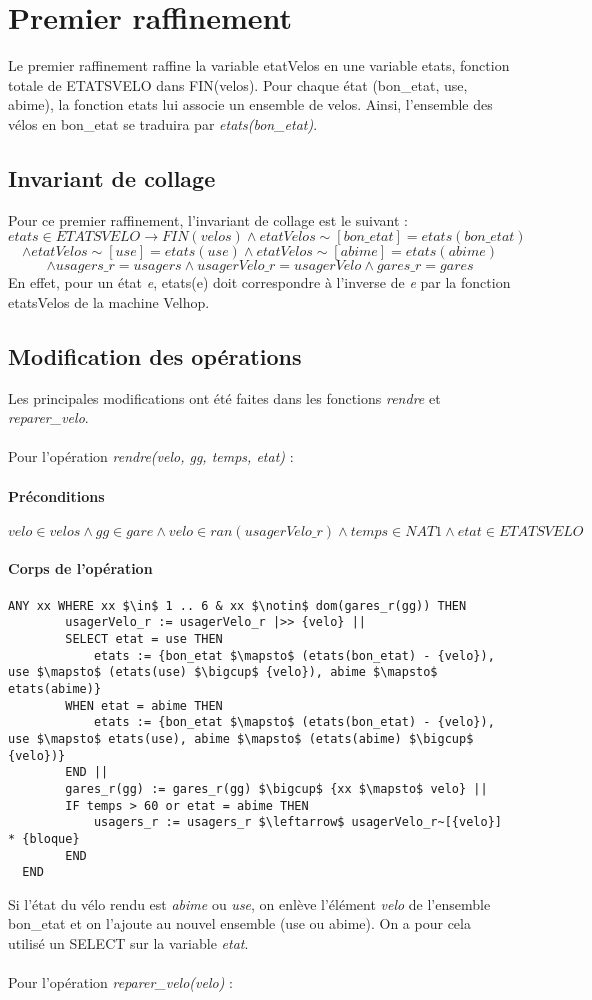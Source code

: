 \documentclass[12pt]{article}
\begin{document}
\section{Premier raffinement}
Le premier raffinement raffine la variable etatVelos en une variable etats, fonction totale de ETATSVELO dans FIN(velos). Pour chaque état (bon\_etat, use, abime), la fonction etats lui associe un ensemble de velos. Ainsi, l'ensemble des vélos en bon\_etat se traduira par \textit{etats(bon\_etat)}.
\subsection{Invariant de collage}
Pour ce premier raffinement, l'invariant de collage est le suivant : \\
\[ etats \in ETATSVELO \rightarrow FIN(velos) \land etatVelos\sim[{bon\_etat}] = etats(bon\_etat) \]
\[ \land etatVelos\sim[{use}] = etats(use) \land etatVelos\sim[{abime}] = etats(abime) \]
\[ \land usagers\_r = usagers \land usagerVelo\_r = usagerVelo \land gares\_r = gares \]
En effet, pour un état \textit{e}, etats(e) doit correspondre à l'inverse de \textit{e} par la fonction etatsVelos de la machine Velhop.
\subsection{Modification des opérations}
Les principales modifications ont été faites dans les fonctions \textit{rendre} et \textit{reparer\_velo}. \\ \\
Pour l'opération \textit{rendre(velo, gg, temps, etat)} :
\paragraph{Préconditions}
\[ velo \in velos \land gg \in gare \land velo \in ran(usagerVelo\_r) \land temps \in NAT1 \land etat \in ETATSVELO\]
\paragraph{Corps de l'opération}
\textbf{}
\begin{lstlisting}[mathescape]
  ANY xx WHERE xx $\in$ 1 .. 6 & xx $\notin$ dom(gares_r(gg)) THEN
        usagerVelo_r := usagerVelo_r |>> {velo} ||
        SELECT etat = use THEN
            etats := {bon_etat $\mapsto$ (etats(bon_etat) - {velo}), use $\mapsto$ (etats(use) $\bigcup$ {velo}), abime $\mapsto$ etats(abime)}
        WHEN etat = abime THEN
            etats := {bon_etat $\mapsto$ (etats(bon_etat) - {velo}), use $\mapsto$ etats(use), abime $\mapsto$ (etats(abime) $\bigcup$ {velo})}
        END ||
        gares_r(gg) := gares_r(gg) $\bigcup$ {xx $\mapsto$ velo} ||
        IF temps > 60 or etat = abime THEN
            usagers_r := usagers_r $\leftarrow$ usagerVelo_r~[{velo}] * {bloque}
        END
  END
\end{lstlisting}
Si l'état du vélo rendu est \textit{abime} ou \textit{use}, on enlève l'élément \textit{velo} de l'ensemble bon\_etat et on l'ajoute au nouvel ensemble (use ou abime). On a pour cela utilisé un SELECT sur la variable \textit{etat}. \\ \\
Pour l'opération \textit{reparer\_velo(velo)} :
\end{document}
